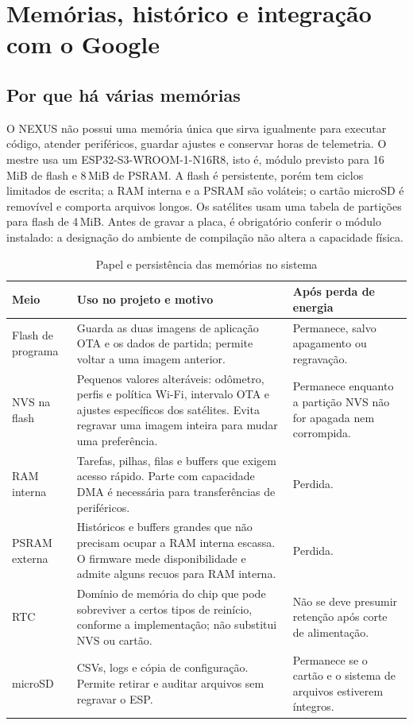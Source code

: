 \chapter{Memórias, histórico e integração com o Google}\label{cap:memorias_google}

\section{Por que há várias memórias}
O NEXUS não possui uma memória única que sirva igualmente para executar código, atender periféricos, guardar ajustes e conservar horas de telemetria. O mestre usa um ESP32-S3-WROOM-1-N16R8, isto é, módulo previsto para 16\,MiB de flash e 8\,MiB de PSRAM. A flash é persistente, porém tem ciclos limitados de escrita; a RAM interna e a PSRAM são voláteis; o cartão microSD é removível e comporta arquivos longos. Os satélites usam uma tabela de partições para flash de 4\,MiB. Antes de gravar a placa, é obrigatório conferir o módulo instalado: a designação do ambiente de compilação não altera a capacidade física.

\begin{table}[htbp]\centering\small
\caption{Papel e persistência das memórias no sistema}\label{tab:memorias_papel}
\begin{tabularx}{\textwidth}{@{}p{2.5cm}X X@{}}\toprule
Meio & Uso no projeto e motivo & Após perda de energia\\\midrule
Flash de programa & Guarda as duas imagens de aplicação OTA e os dados de partida; permite voltar a uma imagem anterior. & Permanece, salvo apagamento ou regravação.\\
NVS na flash & Pequenos valores alteráveis: odômetro, perfis e política Wi-Fi, intervalo OTA e ajustes específicos dos satélites. Evita regravar uma imagem inteira para mudar uma preferência. & Permanece enquanto a partição NVS não for apagada nem corrompida.\\
RAM interna & Tarefas, pilhas, filas e buffers que exigem acesso rápido. Parte com capacidade DMA é necessária para transferências de periféricos. & Perdida.\\
PSRAM externa & Históricos e buffers grandes que não precisam ocupar a RAM interna escassa. O firmware mede disponibilidade e admite alguns recuos para RAM interna. & Perdida.\\
RTC & Domínio de memória do chip que pode sobreviver a certos tipos de reinício, conforme a implementação; não substitui NVS ou cartão. & Não se deve presumir retenção após corte de alimentação.\\
microSD & CSVs, logs e cópia de configuração. Permite retirar e auditar arquivos sem regravar o ESP. & Permanece se o cartão e o sistema de arquivos estiverem íntegros.\\\bottomrule
\end{tabularx}
\end{table}

